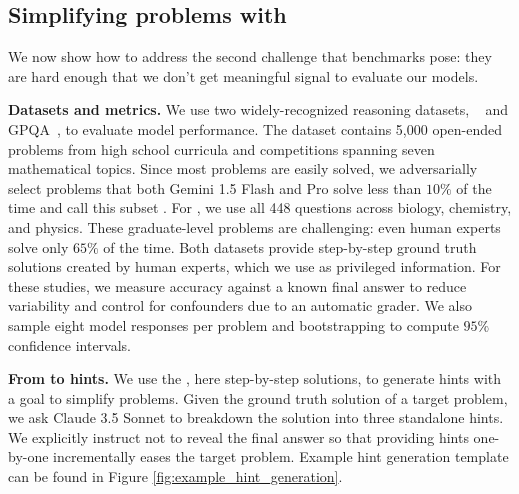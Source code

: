 \subsection{Simplifying \NS problems with \PI}
\label{sec:experiments-hints}


We now show how to address the second challenge that \NS benchmarks pose: they are hard enough that we don't get meaningful signal to evaluate our models.

\textbf{Datasets and metrics.}
We use two widely-recognized reasoning datasets, \MATH~\citep{Hendrycks2021-rp} and GPQA~\citep{Rein2023-ga}, to evaluate model performance.
The \MATH dataset contains 5,000 open-ended problems from high school curricula and competitions spanning seven mathematical topics.
Since most \MATH problems are easily solved, we adversarially select problems that both Gemini 1.5 Flash and Pro solve less than $10\%$ of the time and call this subset \MATHAdv.
For \GPQA, we use all 448 questions across biology, chemistry, and physics.
These graduate-level problems are challenging: even human experts solve only $65\%$ of the time.
Both datasets provide step-by-step ground truth solutions created by human experts, which we use as privileged information.
For these studies, we measure accuracy against a known final answer to reduce variability and control for confounders due to an automatic grader.
We also sample eight model responses per problem and bootstrapping to compute $95\%$ confidence intervals.

\textbf{From \PI to hints.}
We use the \PI, here step-by-step solutions, to generate hints with a goal to simplify \NS problems.
Given the ground truth solution of a target problem, we ask Claude 3.5 Sonnet to breakdown the solution into three standalone hints.
We explicitly instruct not to reveal the final answer so that providing hints one-by-one incrementally eases the target problem. Example hint generation template can be found in Figure \ref{fig:example_hint_generation}.


